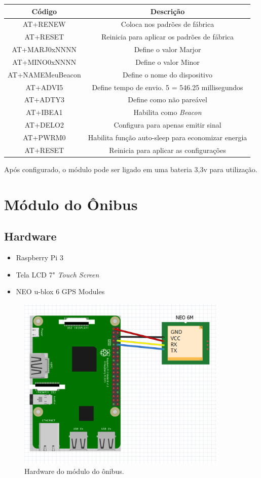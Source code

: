 \documentclass[
	12pt,				%
	oneside,			%
	a4paper,			%
	brazil				%
]{abntex2}
\begin{document}
\begin{tabular}{|c|c|}
\hline 
Código & Descrição \\ 
\hline 
AT+RENEW & Coloca nos padrões de fábrica \\ 
\hline 
AT+RESET & Reinicia para aplicar os padrões de fábrica \\ 
\hline 
AT+MARJ0xNNNN & Define o valor Marjor \\ 
\hline 
AT+MINO0xNNNN & Define o valor Minor \\ 
\hline 
AT+NAMEMeuBeacon & Define o nome do dispositivo \\ 
\hline 
AT+ADVI5 & Define tempo de envio. 5 = 546.25 millisegundos \\ 
\hline 
AT+ADTY3 & Define como não pareável \\ 
\hline 
AT+IBEA1 & Habilita como \textit{Beacon} \\ 
\hline 
AT+DELO2 & Configura para apenas emitir sinal \\ 
\hline 
AT+PWRM0 & Habilita função auto-sleep para economizar energia \\ 
\hline 
AT+RESET & Reinicia para aplicar as configurações \\ 
\hline 
\end{tabular} 

Após configurado, o módulo pode ser ligado em uma bateria 3,3v para utilização.

\newpage

\section{Módulo do Ônibus}

\subsection{Hardware}

\begin{itemize}
\item Raspberry Pi 3
\item Tela LCD 7" \textit{Touch Screen}
\item NEO u-blox 6 GPS Modules
\end{itemize}

\begin{figure}[H]
\centering
\includegraphics[width=10cm, center]{images/schematic-bus-module}
\caption{Hardware do módulo do ônibus.}
\label{Rotulo}
\end{figure}
\end{document}

